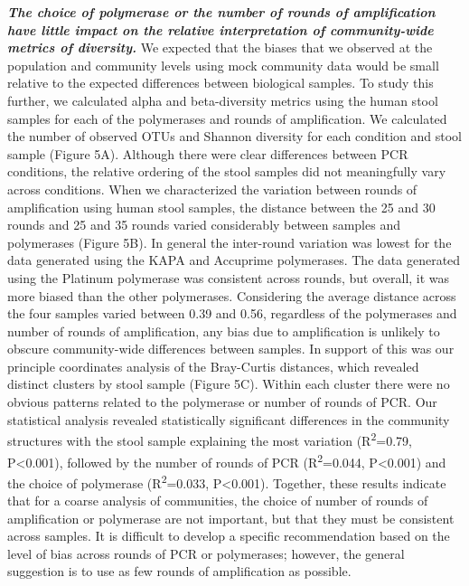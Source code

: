 \documentclass[11pt,]{article}
\begin{document}
\textbf{\emph{The choice of polymerase or the number of rounds of
amplification have little impact on the relative interpretation of
community-wide metrics of diversity.}} We expected that the biases that
we observed at the population and community levels using mock community
data would be small relative to the expected differences between
biological samples. To study this further, we calculated alpha and
beta-diversity metrics using the human stool samples for each of the
polymerases and rounds of amplification. We calculated the number of
observed OTUs and Shannon diversity for each condition and stool sample
(Figure 5A). Although there were clear differences between PCR
conditions, the relative ordering of the stool samples did not
meaningfully vary across conditions. When we characterized the variation
between rounds of amplification using human stool samples, the distance
between the 25 and 30 rounds and 25 and 35 rounds varied considerably
between samples and polymerases (Figure 5B). In general the inter-round
variation was lowest for the data generated using the KAPA and Accuprime
polymerases. The data generated using the Platinum polymerase was
consistent across rounds, but overall, it was more biased than the other
polymerases. Considering the average distance across the four samples
varied between 0.39 and 0.56, regardless of the polymerases and number
of rounds of amplification, any bias due to amplification is unlikely to
obscure community-wide differences between samples. In support of this
was our principle coordinates analysis of the Bray-Curtis distances,
which revealed distinct clusters by stool sample (Figure 5C). Within
each cluster there were no obvious patterns related to the polymerase or
number of rounds of PCR. Our statistical analysis revealed statistically
significant differences in the community structures with the stool
sample explaining the most variation (R\textsuperscript{2}=0.79,
P\textless{}0.001), followed by the number of rounds of PCR
(R\textsuperscript{2}=0.044, P\textless{}0.001) and the choice of
polymerase (R\textsuperscript{2}=0.033, P\textless{}0.001). Together,
these results indicate that for a coarse analysis of communities, the
choice of number of rounds of amplification or polymerase are not
important, but that they must be consistent across samples. It is
difficult to develop a specific recommendation based on the level of
bias across rounds of PCR or polymerases; however, the general
suggestion is to use as few rounds of amplification as possible.
\end{document}

